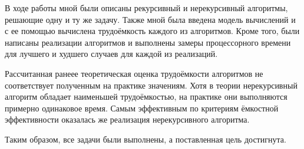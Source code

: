 
В ходе работы мной были описаны рекурсивный и нерекурсивный алгоритмы, решающие одну и ту же задачу. Также мной была введена модель вычислений и с ее помощью вычислена трудоёмкость каждого из алгоритмов. Кроме того, были написаны реализации алгоритмов и выполнены замеры процессорного времени для лучшего и худшего случаев для каждой из реализаций.

Рассчитанная ранеее теоретическая оценка трудоёмкости алгоритмов не соответствует полученным на практике значениям. Хотя в теории нерекурсивный алгоритм обладает наименьшей трудоёмкостью, на практике они выполняются примерно одинаковое время. Самым эффективным по критериям ёмкостной эффективности оказалась же реализация нерекурсивного алгоритма.

Таким образом, все задачи были выполнены, а поставленная цель достигнута.